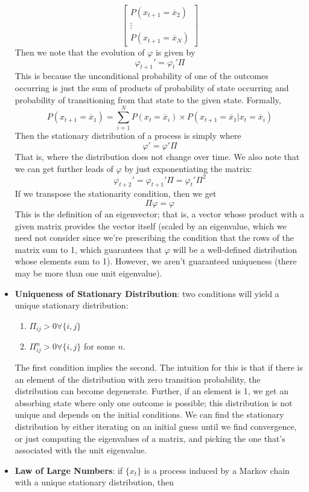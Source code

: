 \documentclass[12pt]{article}
\begin{document}
\begin{itemize}
\[\begin{bmatrix}
    P(x_{t+1} = \overline{x}_2) \\
    \vdots \\
    P(x_{t+1} = \overline{x}_N)
    \end{bmatrix}\]
    Then we note that the evolution of $\varphi$ is given by
    \[\varphi_{t+1}' = \varphi_t'\Pi\]
    This is because the unconditional probability of one of the outcomes occurring is just the sum of products of probability of state occurring and probability of transitioning from that state to the given state. Formally,
    \[P(x_{t+1} = \overline{x}_1) = \sum_{i=1}^NP(x_t = \overline{x}_i)\times P(x_{t+1} = \overline{x}_1|x_t = \overline{x}_i)\]
    Then the stationary distribution of a process is simply where
    \[\varphi' = \varphi'\Pi\]
    That is, where the distribution does not change over time. We also note that we can get further leads of $\varphi$ by just exponentiating the matrix:
    \[\varphi_{t+2}' = \varphi_{t+1}'\Pi = \varphi_t'\Pi^2\]
    If we transpose the stationarity condition, then we get
    \[\Pi \varphi = \varphi\]
    This is the definition of an eigenvector; that is, a vector whose product with a given matrix provides the vector itself (scaled by an eigenvalue, which we need not consider since we're prescribing the condition that the rows of the matrix sum to 1, which guarantees that $\varphi$ will be a well-defined distribution whose elements sum to 1). However, we aren't guaranteed uniqueness (there may be more than one unit eigenvalue).
    \item \textbf{Uniqueness of Stationary Distribution}: two conditions will yield a unique stationary distribution:
    \begin{enumerate}
        \item $\Pi_{ij} > 0 \forall \{i,j\}$
        \item $\Pi^n_{ij} > 0 \forall \{i,j\}$ for some $n$.
    \end{enumerate}
    The first condition implies the second. The intuition for this is that if there is an element of the distribution with zero transition probability, the distribution can become degenerate. Further, if an element is 1, we get an absorbing state where only one outcome is possible; this distribution is not unique and depends on the initial conditions. We can find the stationary distribution by either iterating on an initial guess until we find convergence, or just computing the eigenvalues of a matrix, and picking the one that's associated with the unit eigenvalue.
    \item \textbf{Law of Large Numbers}: if $\{x_t\}$ is a process induced by a Markov chain with a unique stationary distribution, then 

\end{itemize}
\end{document}
